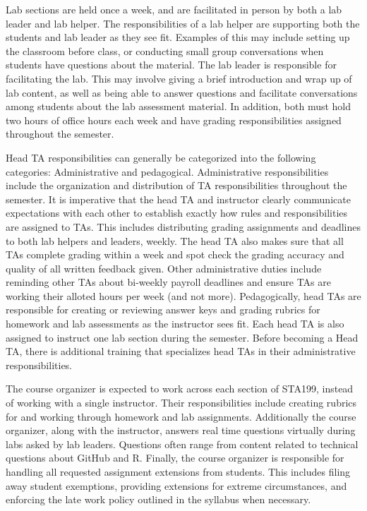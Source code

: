 \documentclass[
  12pt]{article}
\begin{document}
Lab sections are held once a week, and are facilitated in person by both
a lab leader and lab helper. The responsibilities of a lab helper are
supporting both the students and lab leader as they see fit. Examples of
this may include setting up the classroom before class, or conducting
small group conversations when students have questions about the
material. The lab leader is responsible for facilitating the lab. This
may involve giving a brief introduction and wrap up of lab content, as
well as being able to answer questions and facilitate conversations
among students about the lab assessment material. In addition, both must
hold two hours of office hours each week and have grading
responsibilities assigned throughout the semester.

Head TA responsibilities can generally be categorized into the following
categories: Administrative and pedagogical. Administrative
responsibilities include the organization and distribution of TA
responsibilities throughout the semester. It is imperative that the head
TA and instructor clearly communicate expectations with each other to
establish exactly how rules and responsibilities are assigned to TAs.
This includes distributing grading assignments and deadlines to both lab
helpers and leaders, weekly. The head TA also makes sure that all TAs
complete grading within a week and spot check the grading accuracy and
quality of all written feedback given. Other administrative duties
include reminding other TAs about bi-weekly payroll deadlines and ensure
TAs are working their alloted hours per week (and not more).
Pedagogically, head TAs are responsible for creating or reviewing answer
keys and grading rubrics for homework and lab assessments as the
instructor sees fit. Each head TA is also assigned to instruct one lab
section during the semester. Before becoming a Head TA, there is
additional training that specializes head TAs in their administrative
responsibilities.

The course organizer is expected to work across each section of STA199,
instead of working with a single instructor. Their responsibilities
include creating rubrics for and working through homework and lab
assignments. Additionally the course organizer, along with the
instructor, answers real time questions virtually during labs asked by
lab leaders. Questions often range from content related to technical
questions about GitHub and R. Finally, the course organizer is
responsible for handling all requested assignment extensions from
students. This includes filing away student exemptions, providing
extensions for extreme circumstances, and enforcing the late work policy
outlined in the syllabus when necessary.
\end{document}
